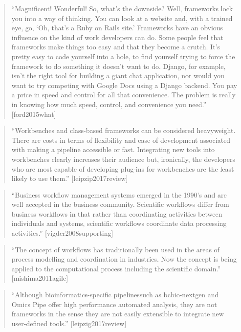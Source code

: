 \documentclass[]{tufte-book}
\begin{document}
\begin{quote}
``Magnificent! Wonderful! So, what's the downside? Well, frameworks lock you
into a way of thinking. You can look at a website and, with a trained eye, go,
`Oh, that's a Ruby on Rails site.' Frameworks have an obvious influence on
the kind of work developers can do. Some people feel that frameworks make things
too easy and that they become a crutch. It's pretty easy to code yourself into
a hole, to find yourself trying to force the framework to do something it
doesn't want to do. Django, for example, isn't the right tool for building a giant
chat application, nor would you want to try competing with Google Docs using
a Django backend. You pay a price in speed and control for all that convenience.
The problem is really in knowing how much speed, control, and convenience you need.''
{[}ford2015what{]}
\end{quote}

\begin{quote}
``Workbenches and class-based frameworks can be considered heavyweight. There
are costs in terms of flexibility and ease of development associated with making
a pipeline accessible or fast. Integrating new tools into workbenches clearly
increases their audience but, ironically, the developers who are most capable of
developing plug-ins for workbenches are the least likely to use them.''
{[}leipzip2017review{]}
\end{quote}

\begin{quote}
``Business workflow management systems emerged in the 1990's and are well accepted
in the business community. Scientific workflows differ from business workflows in that
rather than coordinating activities between individuals and systems, scientific
workflows coordinate data processing activities.'' {[}vigder2008supporting{]}
\end{quote}

\begin{quote}
``The concept of workflows has traditionally been used in the areas of process
modelling and coordination in industries. Now the concept is being applied to
the computational process including the scientific domain.'' {[}mishima2011agile{]}
\end{quote}

\begin{quote}
``Although bioinformatics-specific pipelinessuch as bcbio-nextgen and Omics Pipe
offer high performance automated analysis, they are not frameworks in the sense they
are not easily extensible to integrate new user-defined tools.'' {[}leipzig2017review{]}
\end{quote}
\end{document}
